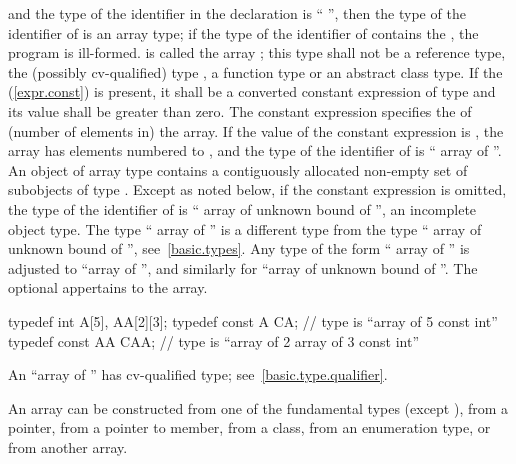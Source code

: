 and the type of the identifier in the declaration
is
``
'',
then the type of the identifier of
is an array type; if the type of the identifier of 
contains the  ,
the program is ill-formed.
is called the array
;
this type shall not be a reference type, the (possibly cv-qualified) type
,
a function type or an abstract class type.
%
If the
(\ref{expr.const}) is present, it shall be a converted constant
expression of type  and
its value shall be greater than zero.
The constant expression specifies the
%
%
of (number of elements in) the array.
If the value of the constant expression is
,
the array has
elements numbered
to
,
and the type of the identifier of
is `` array of
''.
An object of array type contains a contiguously allocated non-empty set of
subobjects of type
.
Except as noted below, if
the constant expression is omitted, the type of the identifier of
is `` array of unknown bound of
'',
an incomplete object type.
The type `` array of
''
is a different type from the type
`` array of unknown bound of
'',
see~\ref{basic.types}.
Any type of the form
`` array of
''
is adjusted to
``array of
'',
and similarly for
``array of unknown bound of
''.
The optional  appertains to the array.
\enterexample

\begin{codeblock}
typedef int A[5], AA[2][3];
typedef const A CA;             // type is ``array of 5 const int''
typedef const AA CAA;           // type is ``array of 2 array of 3 const int''
\end{codeblock}
\exitexample
\enternote
An
``array of
''
has cv-qualified type; see~\ref{basic.type.qualifier}.
\exitnote

\pnum
An array can be constructed from one of the fundamental types
(except
),
from a pointer,
from a pointer to member, from a class,
from an enumeration type,
or from another array.

